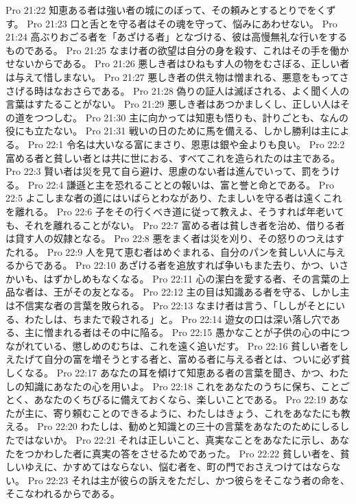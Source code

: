 Pro 21:22  知恵ある者は強い者の城にのぼって、その頼みとするとりでをくずす。
Pro 21:23  口と舌とを守る者はその魂を守って、悩みにあわせない。
Pro 21:24  高ぶりおごる者を「あざける者」となづける、彼は高慢無礼な行いをするものである。
Pro 21:25  なまけ者の欲望は自分の身を殺す、これはその手を働かせないからである。
Pro 21:26  悪しき者はひねもす人の物をむさぼる、正しい者は与えて惜しまない。
Pro 21:27  悪しき者の供え物は憎まれる、悪意をもってささげる時はなおさらである。
Pro 21:28  偽りの証人は滅ぼされる、よく聞く人の言葉はすたることがない。
Pro 21:29  悪しき者はあつかましくし、正しい人はその道をつつしむ。
Pro 21:30  主に向かっては知恵も悟りも、計りごとも、なんの役にも立たない。
Pro 21:31  戦いの日のために馬を備える、しかし勝利は主による。
Pro 22:1  令名は大いなる富にまさり、恩恵は銀や金よりも良い。
Pro 22:2  富める者と貧しい者とは共に世におる、すべてこれを造られたのは主である。
Pro 22:3  賢い者は災を見て自ら避け、思慮のない者は進んでいって、罰をうける。
Pro 22:4  謙遜と主を恐れることとの報いは、富と誉と命とである。
Pro 22:5  よこしまな者の道にはいばらとわながあり、たましいを守る者は遠くこれを離れる。
Pro 22:6  子をその行くべき道に従って教えよ、そうすれば年老いても、それを離れることがない。
Pro 22:7  富める者は貧しき者を治め、借りる者は貸す人の奴隷となる。
Pro 22:8  悪をまく者は災を刈り、その怒りのつえはすたれる。
Pro 22:9  人を見て恵む者はめぐまれる、自分のパンを貧しい人に与えるからである。
Pro 22:10  あざける者を追放すれば争いもまた去り、かつ、いさかいも、はずかしめもなくなる。
Pro 22:11  心の潔白を愛する者、その言葉の上品な者は、王がその友となる。
Pro 22:12  主の目は知識ある者を守る、しかし主は不信実な者の言葉を敗られる。
Pro 22:13  なまけ者は言う、「ししがそとにいる、わたしは、ちまたで殺される」と。
Pro 22:14  遊女の口は深い落し穴である、主に憎まれる者はその中に陥る。
Pro 22:15  愚かなことが子供の心の中につながれている、懲しめのむちは、これを遠く追いだす。
Pro 22:16  貧しい者をしえたげて自分の富を増そうとする者と、富める者に与える者とは、ついに必ず貧しくなる。
Pro 22:17  あなたの耳を傾けて知恵ある者の言葉を聞き、かつ、わたしの知識にあなたの心を用いよ。
Pro 22:18  これをあなたのうちに保ち、ことごとく、あなたのくちびるに備えておくなら、楽しいことである。
Pro 22:19  あなたが主に、寄り頼むことのできるように、わたしはきょう、これをあなたにも教える。
Pro 22:20  わたしは、勧めと知識との三十の言葉をあなたのためにしるしたではないか。
Pro 22:21  それは正しいこと、真実なことをあなたに示し、あなたをつかわした者に真実の答をさせるためであった。
Pro 22:22  貧しい者を、貧しいゆえに、かすめてはならない、悩む者を、町の門でおさえつけてはならない。
Pro 22:23  それは主が彼らの訴えをただし、かつ彼らをそこなう者の命を、そこなわれるからである。
